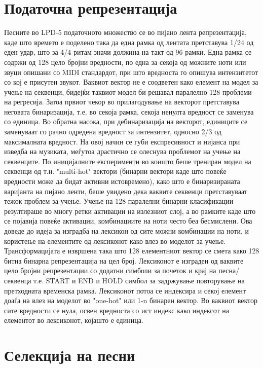 \section{Податочна репрезентација}

Песните во LPD-5 податочното множество се во пијано лента репрезентација, каде што времето е поделено така да една рамка од лентата претставува 1/24 од еден удар, што за 4/4 ритам значи должина на такт од 96 рамки. Една рамка се содржи од 128 цело бројни вредности, по една за секоја од можните ноти или звуци опишани со MIDI стандардот, при што вредноста го опишува интензитетот со кој е присутен звукот. Ваквиот вектор не е соодветен како елемент на модел за учење на секвенци, бидејќи таквиот модел би решавал паралелно 128 проблеми на регресија. Затоа првиот чекор во прилагодување на векторот претставува неговата бинаризација, т.е. во секоја рамка, секоја ненулта вредност се заменува со единица. Во обратна насока, при дебинаризација на векторот, единиците се заменуваат со рачно одредена вредност за интензитет, односно 2/3 од максималната вредност. На овој начин се губи експресивност и нијанса при изведба на музиката, меѓутоа драстично се олеснува проблемот на учење на секвенците. 
По иницијалните експерименти во коишто беше трениран модел на секвенци од т.н. "multi-hot" вектори (бинарни вектори каде што повеќе вредности може да бидат активни истовремено), како што е бинаризираната варијанта на пијано ленти, беше увидено дека ваквите секвенци претставуваат тежок проблем за учење. Учење на 128 паралелни бинарни класификации резултираше во многу ретки активации на излезниот слој, а во рамките каде што се појавија повеќе активации, комбинациите на ноти често беа бесмислени. Ова доведе до идеја за изградба на лексикон од сите можни комбинации на ноти, и користење на елементите од лексиконот како влез во моделот за учење. Трансформацијата е извршена така што 128 елементниот вектор се смета како 128 битна бинарна репрезентација на цел број. Лексиконот е изграден од ваквите цело бројни репрезентации со додатни симболи за почеток и крај на песна/секвенца т.е. START и END и HOLD симбол за задржување повторување на претходната временска рамка. Лексиконот потоа се индексира и секој елемент доаѓа на влез на моделот во "one-hot" или 1-n бинарен вектор. Во ваквиот вектор сите вредности се нула, освен вредноста со ист индекс како индексот на елементот во лексиконот, којашто е единица.

\section{Селекција на песни}

